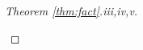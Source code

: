 \documentclass[smallextended]{svjour3hack}       %
\makeatletter
\newcommand{\jon}[1]{\noindent{\color{cyan}[Jon:]\ {#1}}}
\DeclareMathOperator{\Diag}{Diag}
\renewcommand*{\top}{%
  {\mathpalette\@transpose{}}%
}
\newcommand*{\@transpose}[2]{%
  \raisebox{\depth}{$\m@th#1\mathsf{T}$}%
}
\makeatother
\begin{document}
\begin{proof}[Theorem \ref{thm:fact}.iii,iv,v]
\begin{itemize}




\end{itemize}
\end{proof}
\end{document}
